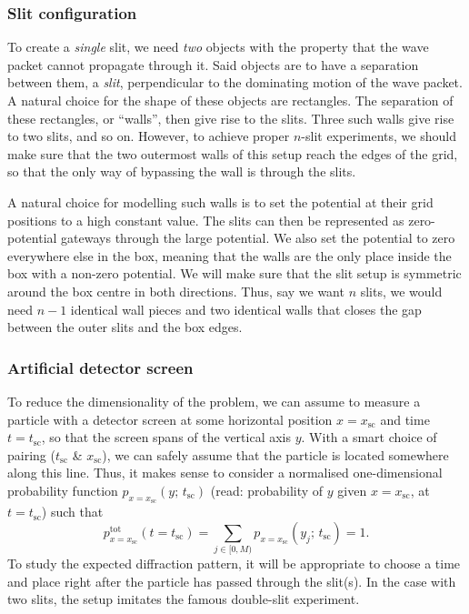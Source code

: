     \subsubsection{Slit configuration}\label{sec:methods:simulation:slit_config}

        To create a \textit{single} slit, we need \textit{two} objects with the property that the wave packet cannot propagate through it. Said objects are to have a separation between them, a \textit{slit}, perpendicular to the dominating motion of the wave packet. A natural choice for the shape of these objects are rectangles. The separation of these rectangles, or ``walls'', then give rise to the slits. Three such walls give rise to two slits, and so on. However, to achieve proper $n$-slit experiments, we should make sure that the two outermost walls of this setup reach the edges of the grid, so that the only way of bypassing the wall is through the slits. 

        A natural choice for modelling such walls is to set the potential at their grid positions to a high constant value. The slits can then be represented as zero-potential gateways through the large potential. We also set the potential to zero everywhere else in the box, meaning that the walls are the only place inside the box with a non-zero potential. We will make sure that the slit setup is symmetric around the box centre in both directions. Thus, say we want $n$ slits, we would need $n-1$ identical wall pieces and two identical walls that closes the gap between the outer slits and the box edges.
    
    \subsubsection{Artificial detector screen}\label{sec:methods:simulation:screen}

        To reduce the dimensionality of the problem, we can assume to measure a particle with a detector screen at some horizontal position $x=x_\mathrm{sc}$ and time $t=t_\mathrm{sc}$, so that the screen spans of the vertical axis $y$. With a smart choice of pairing ($t_\mathrm{sc}$ \& $x_\mathrm{sc}$), we can safely assume that the particle is located somewhere along this line. Thus, it makes sense to consider a normalised one-dimensional probability function $p_{x=x_\mathrm{sc}}(y;\, t_\mathrm{sc})$ (read: probability of $y$ given $x=x_\mathrm{sc}$, at $t=t_\mathrm{sc}$) such that
        \begin{equation}\label{eq:tot_probability_along_y}
            p^\mathrm{tot}_{x=x_\mathrm{sc}}(t\!=\!t_\mathrm{sc}) =\sum_{j\in [0, M)} p_{x=x_\mathrm{sc}}(y_j;\, t_\mathrm{sc}) = 1.
        \end{equation}
        To study the expected diffraction pattern, it will be appropriate to choose a time and place right after the particle has passed through the slit(s). In the case with two slits, the setup imitates the famous double-slit experiment.

